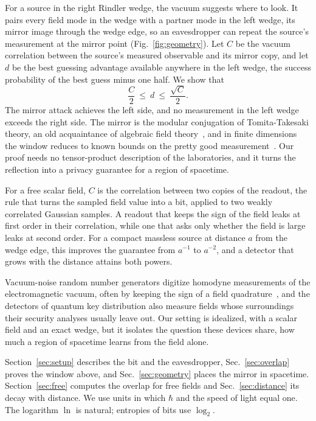 \documentclass[11pt,a4paper]{article}
\begin{document}
For a source in the right Rindler wedge, the vacuum suggests where to look. It pairs every field mode in the wedge with a partner mode in the left wedge, its mirror image through the wedge edge, so an eavesdropper can repeat the source's measurement at the mirror point (Fig.~\ref{fig:geometry}). Let $C$ be the vacuum correlation between the source's measured observable and its mirror copy, and let $d$ be the best guessing advantage available anywhere in the left wedge, the success probability of the best guess minus one half. We show that
\begin{equation*}
 \frac{C}{2}\ \le\ d\ \le\ \frac{\sqrt C}{2}.
\end{equation*}
The mirror attack achieves the left side, and no measurement in the left wedge exceeds the right side. The mirror is the modular conjugation of Tomita-Takesaki theory, an old acquaintance of algebraic field theory~\cite{araki1974some,summers1987maximal,guedes2024unruh,caribe2026modular}, and in finite dimensions the window reduces to known bounds on the pretty good measurement~\cite{hausladen1994pretty,renes2017better}. Our proof needs no tensor-product description of the laboratories, and it turns the reflection into a privacy guarantee for a region of spacetime.

For a free scalar field, $C$ is the correlation between two copies of the readout, the rule that turns the sampled field value into a bit, applied to two weakly correlated Gaussian samples. A readout that keeps the sign of the field leaks at first order in their correlation, while one that asks only whether the field is large leaks at second order. For a compact massless source at distance $a$ from the wedge edge, this improves the guarantee from $a^{-1}$ to $a^{-2}$, and a detector that grows with the distance attains both powers.

Vacuum-noise random number generators digitize homodyne measurements of the electromagnetic vacuum, often by keeping the sign of a field quadrature~\cite{gabriel2010generator,symul2011real}, and the detectors of quantum key distribution also measure fields whose surroundings their security analyses usually leave out. Our setting is idealized, with a scalar field and an exact wedge, but it isolates the question these devices share, how much a region of spacetime learns from the field alone.

Section~\ref{sec:setup} describes the bit and the eavesdropper, Sec.~\ref{sec:overlap} proves the window above, and Sec.~\ref{sec:geometry} places the mirror in spacetime. Section~\ref{sec:free} computes the overlap for free fields and Sec.~\ref{sec:distance} its decay with distance. We use units in which $\hbar$ and the speed of light equal one. The logarithm $\ln$ is natural; entropies of bits use $\log_2$.
\end{document}
